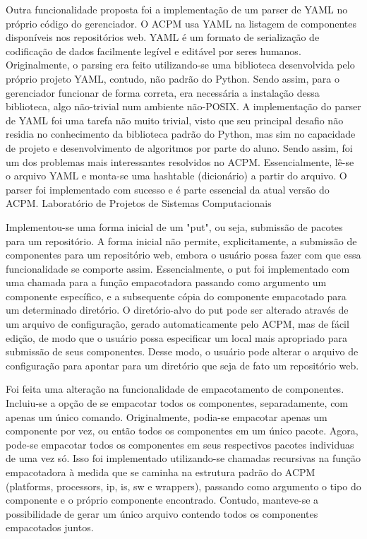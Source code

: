 \documentclass[12pt]{article}
\begin{document}
Outra funcionalidade proposta foi a implementação de um parser de YAML no
próprio código do gerenciador. O ACPM usa YAML na listagem de componentes
disponíveis nos repositórios web. YAML é um formato de serialização de
codificação de dados facilmente legível e editável por seres humanos.
Originalmente, o parsing era feito utilizando-se uma biblioteca desenvolvida
pelo próprio projeto YAML, contudo, não padrão do Python. Sendo assim, para o
gerenciador funcionar de forma correta, era necessária a instalação dessa
biblioteca, algo não-trivial num ambiente não-POSIX. A implementação do parser
de YAML foi uma tarefa não muito trivial, visto que seu principal desafio não
residia no conhecimento da biblioteca padrão do Python, mas sim no capacidade
de projeto e desenvolvimento de algoritmos por parte do aluno. Sendo assim, foi
um dos problemas mais interessantes resolvidos no ACPM. Essencialmente, lê-se o
arquivo YAML e monta-se uma hashtable (dicionário) a partir do arquivo. O parser
foi implementado com sucesso e é parte essencial da atual versão do ACPM.
Laboratório de Projetos de Sistemas Computacionais

Implementou-se uma forma inicial de um "put", ou seja, submissão de pacotes para
um repositório. A forma inicial não permite, explicitamente, a submissão de
componentes para um repositório web, embora o usuário possa fazer com que essa
funcionalidade se comporte assim. Essencialmente, o put foi implementado com uma
chamada para a função empacotadora passando como argumento um componente
específico, e a subsequente cópia do componente empacotado para um determinado
diretório. O diretório-alvo do put pode ser alterado através de um arquivo de
configuração, gerado automaticamente pelo ACPM, mas de fácil edição, de modo que
o usuário possa especificar um local mais apropriado para submissão de seus
componentes. Desse modo, o usuário pode alterar o arquivo de configuração para
apontar para um diretório que seja de fato um repositório web.

Foi feita uma alteração na funcionalidade de empacotamento de componentes.
Incluiu-se a opção de se empacotar todos os componentes, separadamente, com
apenas um único comando. Originalmente, podia-se empacotar apenas um componente
por vez, ou então todos os componentes em um único pacote. Agora, pode-se
empacotar todos os componentes em seus respectivos pacotes individuas de uma vez
só. Isso foi implementado utilizando-se chamadas recursivas na função
empacotadora à medida que se caminha na estrutura padrão do ACPM (platforms,
processors, ip, is, sw e wrappers), passando como argumento o tipo do componente
e o próprio componente encontrado. Contudo, manteve-se a possibilidade de gerar
um único arquivo contendo todos os componentes empacotados juntos.
\end{document}
